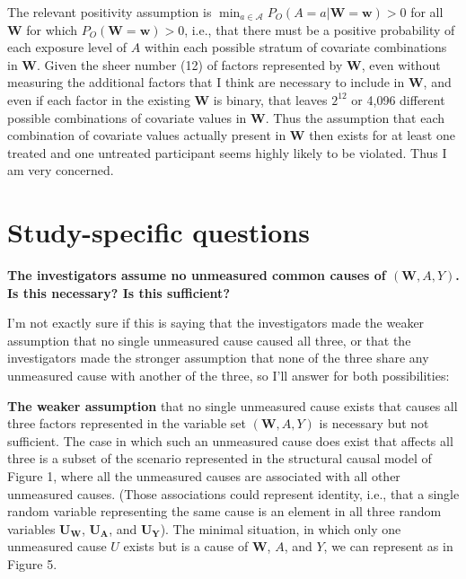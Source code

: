 \documentclass{article}\usepackage[]{graphicx}\usepackage[]{xcolor}
\begin{document}
\begin{enumerate}[label=\textbf{\arabic*.}]
The relevant positivity assumption is $\min_{a \in \mathcal{A}}P_O(A=a|\bm{W}=\bm{w})>0$ for all $\bm{W}$ for which $P_O(\bm{W}=\bm{w})>0$, i.e., that there must be a positive probability of each exposure level of $A$ within each possible stratum of covariate combinations in $\bm{W}$. Given the sheer number (12) of factors represented by $\bm{W}$, even without measuring the additional factors that I think are necessary to include in $\bm{W}$, and even if each factor in the existing $\bm{W}$ is binary, that leaves $2^{12}$ or 4,096 different possible combinations of covariate values in $\bm{W}$. Thus the assumption that each combination of covariate values actually present in $\bm{W}$ then exists for at least one treated and one untreated participant seems highly likely to be violated. Thus I am very concerned.

\end{enumerate}

\setlength{\leftskip}{0cm}

\section{Study-specific questions}

\setlength{\leftskip}{0.8cm}

\textbf{The investigators assume no unmeasured common causes of $(\bm{W}, A, Y)$. Is this necessary? Is this sufficient?} 

I'm not exactly sure if this is saying that the investigators made the weaker assumption that no single unmeasured cause caused all three, or that the investigators made the stronger assumption that none of the three share any unmeasured cause with another of the three, so I'll answer for both possibilities:

\vspace{2mm}

\textbf{The weaker assumption} that no single unmeasured cause exists that causes all three factors represented in the variable set $(\bm{W}, A, Y)$ is necessary but not sufficient. The case in which such an unmeasured cause does exist that affects all three is a subset of the scenario represented in the structural causal model of Figure 1, where all the unmeasured causes are associated with all other unmeasured causes. (Those associations could represent identity, i.e., that a single random variable representing the same cause is an element in all three random variables $\bm{U_W}$, $\bm{U_A}$, and $\bm{U_Y}$). The minimal situation, in which only one unmeasured cause $U$ exists but is a cause of $\bm{W}$, $A$, and $Y$, we can represent as in Figure 5.
\end{document}
